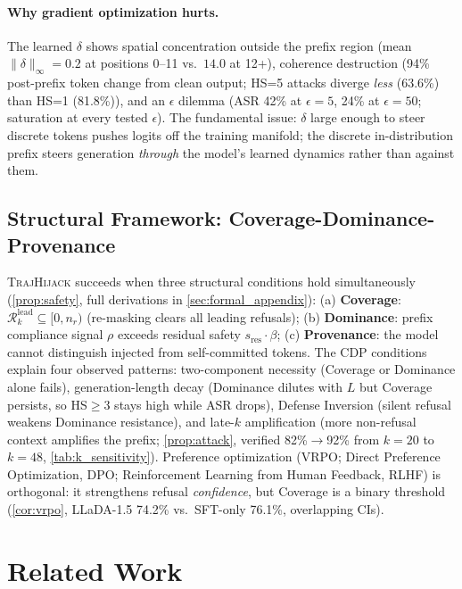 \documentclass{article}
\theoremstyle{coloredthm}
\newcommand{\method}{\textsc{TrajHijack}}
\begin{document}
\paragraph{Why gradient optimization hurts.} The learned $\delta$ shows spatial concentration outside the prefix region (mean $\|\delta\|_\infty{=}0.2$ at positions 0--11 vs.\ $14.0$ at 12+), coherence destruction (94\% post-prefix token change from clean output; HS=5 attacks diverge \emph{less} (63.6\%) than HS=1 (81.8\%)), and an $\epsilon$ dilemma (ASR 42\% at $\epsilon{=}5$, 24\% at $\epsilon{=}50$; saturation at every tested $\epsilon$). The fundamental issue: $\delta$ large enough to steer discrete tokens pushes logits off the training manifold; the discrete in-distribution prefix steers generation \emph{through} the model's learned dynamics rather than against them.

\subsection{Structural Framework: Coverage-Dominance-Provenance}
\label{sec:formal}

\method{} succeeds when three structural conditions hold simultaneously (\cref{prop:safety}, full derivations in \cref{sec:formal_appendix}): (a) \textbf{Coverage}: $\mathcal{R}^{\text{lead}}_k \subseteq [0, n_r)$ (re-masking clears all leading refusals); (b) \textbf{Dominance}: prefix compliance signal $\rho$ exceeds residual safety $s_{\text{res}} \cdot \beta$; (c) \textbf{Provenance}: the model cannot distinguish injected from self-committed tokens. The CDP conditions explain four observed patterns: two-component necessity (Coverage or Dominance alone fails), generation-length decay (Dominance dilutes with $L$ but Coverage persists, so HS$\geq$3 stays high while ASR drops), Defense Inversion (silent refusal weakens Dominance resistance), and late-$k$ amplification (more non-refusal context amplifies the prefix; \cref{prop:attack}, verified 82\%$\to$92\% from $k{=}20$ to $k{=}48$, \cref{tab:k_sensitivity}). Preference optimization (VRPO; Direct Preference Optimization, DPO; Reinforcement Learning from Human Feedback, RLHF) is orthogonal: it strengthens refusal \emph{confidence}, but Coverage is a binary threshold (\cref{cor:vrpo}, LLaDA-1.5 74.2\% vs.\ SFT-only 76.1\%, overlapping CIs).

\section{Related Work}
\label{sec:related}
\end{document}
